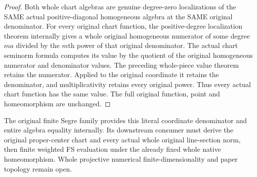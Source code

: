 \begin{proof}
Both whole chart algebras are genuine degree-zero localizations of the SAME actual positive-diagonal homogeneous algebra at the SAME original denominator. For every original chart function, the positive-degree localization theorem internally gives a whole original homogeneous numerator of some degree $ma$ divided by the $m$th power of that original denominator. The actual chart seminorm formula computes its value by the quotient of the original homogeneous numerator and denominator values. The preceding whole-piece value theorem retains the numerator. Applied to the original coordinate it retains the denominator, and multiplicativity retains every original power. Thus every actual chart function has the same value. The full original function, point and homeomorphism are unchanged.
\end{proof}
The original finite Segre family provides this literal coordinate denominator and entire algebra equality internally. Its downstream consumer must derive the original proper-center chart and every actual whole original line-section norm, then finite weighted FS evaluation under the already fixed whole native homeomorphism. Whole projective numerical finite-dimensionality and paper topology remain open.
